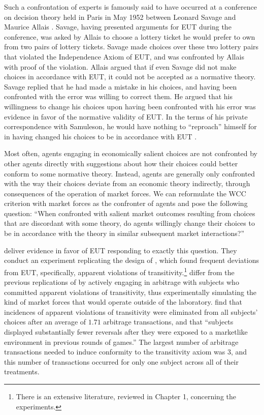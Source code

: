 \documentclass[../main.tex]{subfiles}
\begin{document}
Such a confrontation of experts is famously said to have occurred at a conference on decision theory held in Paris in May 1952 between Leonard Savage and Maurice Allais \parencites[1]{Allais1953}[221]{Moscati2016}.
Savage, having presented arguments for EUT during the conference, was asked by Allais to choose a lottery ticket he would prefer to own from two pairs of lottery tickets.
Savage made choices over these two lottery pairs that violated the Independence Axiom of EUT, and was confronted by Allais with proof of the violation.
Allais argued that if even Savage did not make choices in accordance with EUT, it could not be accepted as a normative theory.
Savage replied that he had made a mistake in his choices, and having been confronted with the error was willing to correct them.
He argued that his willingness to change his choices upon having been confronted with his error was evidence in favor of the normative validity of EUT.
In the terms of his private correspondence with Samuleson, he would have nothing to \enquote{reproach} himself for in having changed his choices to be in accordance with EUT \parencite[230]{Moscati2016}.

Most often, agents engaging in economically salient choices are not confronted by other agents directly with suggestions about how their choices could better conform to some normative theory.
Instead, agents are generally only confronted with the way their choices deviate from an economic theory indirectly, through consequences of the operation of market forces.
We can reformulate the WCC criterion with market forces as the confronter of agents and pose the following question:
\enquote{When confronted with salient market outcomes resulting from choices that are discordant with some theory, do agents willingly change their choices to be in accordance with the theory in similar subsequent market interactions?}

\textcite{Chu1990} deliver evidence in favor of EUT responding to exactly this question.
They conduct an experiment replicating the design of \textcite{Grether1979}, which found frequent deviations from EUT, specifically, apparent violations of transitivity.\footnote{
	There is an extensive literature, reviewed in Chapter 1, concerning the \textcite{Grether1979} experiments.
}
\textcite{Chu1990} differ from the previous replications of \textcite{Grether1979} by actively engaging in arbitrage with subjects who committed apparent violations of transitivity, thus experimentally simulating the kind of market forces that would operate outside of the laboratory.
\textcite[910]{Chu1990} find that incidences of apparent violations of transitivity were eliminated from all subjects' choices after an average of $1.71$ arbitrage transactions, and that \enquote{subjects displayed substantially fewer reversals  after they were exposed to a marketlike environment in previous rounds of games.}
The largest number of arbitrage transactions needed to induce conformity to the transitivity axiom was $3$, and this number of transactions occurred for only one subject across all of their treatments.
\end{document}
